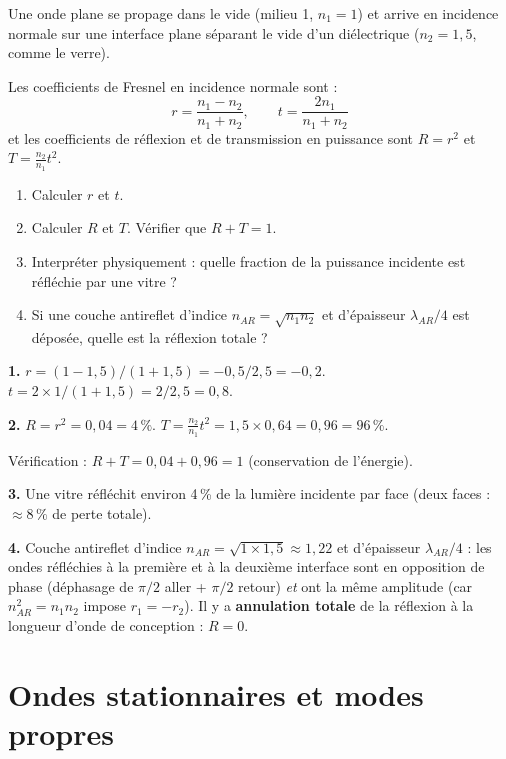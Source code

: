 \documentclass[12pt,a4paper]{article}
\begin{document}
\begin{boiteexercice}
Une onde plane se propage dans le vide (milieu 1, $n_1=1$) et arrive en incidence normale sur une interface plane séparant le vide d'un diélectrique ($n_2=1{,}5$, comme le verre).

Les coefficients de Fresnel en incidence normale sont :
\[
r = \frac{n_1-n_2}{n_1+n_2}, \qquad t = \frac{2n_1}{n_1+n_2}
\]
et les coefficients de réflexion et de transmission en puissance sont $R = r^2$ et $T = \frac{n_2}{n_1}t^2$.
\begin{enumerate}
  \item Calculer $r$ et $t$.
  \item Calculer $R$ et $T$. Vérifier que $R + T = 1$.
  \item Interpréter physiquement : quelle fraction de la puissance incidente est réfléchie par une vitre ?
  \item Si une couche antireflet d'indice $n_{AR} = \sqrt{n_1 n_2}$ et d'épaisseur $\lambda_{AR}/4$ est déposée, quelle est la réflexion totale ?
\end{enumerate}
\end{boiteexercice}

\begin{boitecorrige}
\textbf{1.} $r = (1-1{,}5)/(1+1{,}5) = -0{,}5/2{,}5 = -0{,}2$. $t = 2\times1/(1+1{,}5) = 2/2{,}5 = 0{,}8$.

\textbf{2.} $R = r^2 = 0{,}04 = 4\,\%$. $T = \frac{n_2}{n_1}t^2 = 1{,}5\times0{,}64 = 0{,}96 = 96\,\%$.

Vérification : $R + T = 0{,}04 + 0{,}96 = 1$ (conservation de l'énergie).

\textbf{3.} Une vitre réfléchit environ 4\,\% de la lumière incidente par face (deux faces : $\approx 8\,\%$ de perte totale).

\textbf{4.} Couche antireflet d'indice $n_{AR} = \sqrt{1\times1{,}5} \approx 1{,}22$ et d'épaisseur $\lambda_{AR}/4$ : les ondes réfléchies à la première et à la deuxième interface sont en opposition de phase (déphasage de $\pi/2$ aller + $\pi/2$ retour) \textit{et} ont la même amplitude (car $n_{AR}^2 = n_1 n_2$ impose $r_1 = -r_2$). Il y a \textbf{annulation totale} de la réflexion à la longueur d'onde de conception : $R = 0$.
\end{boitecorrige}


\section{Ondes stationnaires et modes propres}
\end{document}

